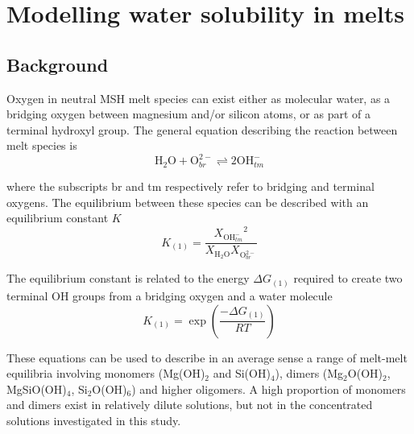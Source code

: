 \documentclass[review]{elsarticle}
\begin{document}
\section{Modelling water solubility in melts}
\subsection{Background}
Oxygen in neutral MSH melt species can exist either as molecular water, as a bridging oxygen between magnesium and/or silicon atoms, or as part of a terminal hydroxyl group. The general equation describing the reaction between melt species is
\begin{equation}
\textrm{H}_2\textrm{O} + \textrm{O}_{br}^{2-} \rightleftharpoons 2 \textrm{OH}_{tm}^-
\label{eqn:speciation}
\end{equation}

where the subscripts br and tm respectively refer to bridging and terminal oxygens. The equilibrium between these species can be described with an equilibrium constant $K$ \cite[e.g.][]{Stolper1982}
\begin{equation}
K_{(1)} = \frac{{X_{\textrm{OH}_{tm}^-}}^2}{X_{\textrm{H}_2\textrm{O}} X_{\textrm{O}_{br}^{2-}} }
\label{eqn:equilibrium_constant}
\end{equation}

The equilibrium constant is related to the energy $\Delta G_{(1)}$ required to create two terminal OH groups from a bridging oxygen and a water molecule
\begin{equation}
K_{(1)} = \exp\left(\frac{-\Delta G_{(1)}}{RT}\right)
\end{equation}

These equations can be used to describe in an average sense a range of melt-melt equilibria involving monomers (Mg(OH)$_2$ and Si(OH)$_4$), dimers (Mg$_2$O(OH)$_2$, MgSiO(OH)$_4$, Si$_2$O(OH)$_6$) and higher oligomers. A high proportion of monomers and dimers exist in relatively dilute solutions, but not in the concentrated solutions investigated in this study.
\end{document}
